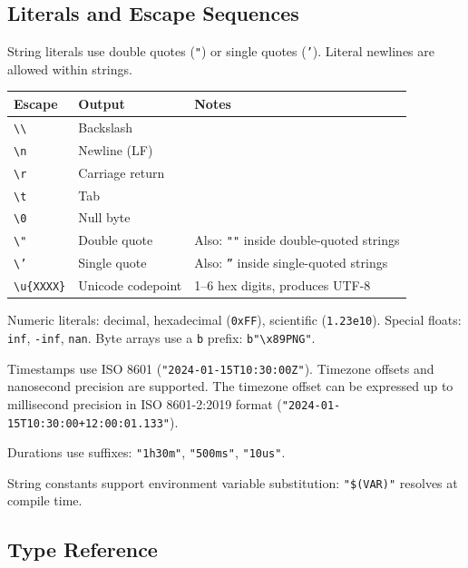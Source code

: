 \documentclass[10pt,onecolumn]{article}
\begin{document}
\subsection{Literals and Escape Sequences}

String literals use double quotes (\texttt{"}) or single quotes (\texttt{'}). Literal newlines are allowed within strings.

\begin{minipage}{\textwidth}
\small
\begin{tabular}{@{}llp{2.5in}@{}}
\toprule
\textbf{Escape} & \textbf{Output} & \textbf{Notes} \\
\midrule
\texttt{\textbackslash\textbackslash} & Backslash & \\
\texttt{\textbackslash n} & Newline (LF) & \\
\texttt{\textbackslash r} & Carriage return & \\
\texttt{\textbackslash t} & Tab & \\
\texttt{\textbackslash 0} & Null byte & \\
\texttt{\textbackslash "} & Double quote & Also: \texttt{""} inside double-quoted strings \\
\texttt{\textbackslash '} & Single quote & Also: \texttt{''} inside single-quoted strings \\
\texttt{\textbackslash u\{XXXX\}} & Unicode codepoint & 1--6 hex digits, produces UTF-8 \\
\bottomrule
\end{tabular}
\end{minipage}

Numeric literals: decimal, hexadecimal (\texttt{0xFF}), scientific (\texttt{1.23e10}). Special floats: \texttt{inf}, \texttt{-inf}, \texttt{nan}. Byte arrays use a \texttt{b} prefix: \texttt{b"\textbackslash x89PNG"}.

Timestamps use ISO 8601 (\texttt{"2024-01-15T10:30:00Z"}). Timezone offsets and nanosecond precision are supported. The timezone offset can be expressed up to millisecond precision in ISO 8601-2:2019 format (\texttt{"2024-01-15T10:30:00+12:00:01.133"}).

Durations use suffixes: \texttt{"1h30m"}, \texttt{"500ms"}, \texttt{"10us"}.

String constants support environment variable substitution: \texttt{"\$(VAR)"} resolves at compile time.

\subsection{Type Reference}
\end{document}
